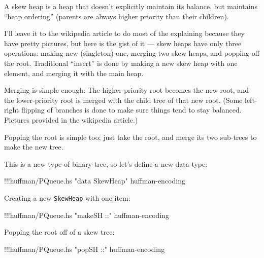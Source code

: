 \documentclass[]{article}
\newenvironment{Shaded}{}{}
\newcommand{\StringTok}[1]{\textcolor[rgb]{0.25,0.44,0.63}{{#1}}}
\newcommand{\FunctionTok}[1]{\textcolor[rgb]{0.02,0.16,0.49}{{#1}}}
\newcommand{\NormalTok}[1]{{#1}}
\begin{document}
A skew heap is a heap that doesn't explicitly maintain its balance, but
maintains ``heap ordering'' (parents are always higher priority than
their children).

I'll leave it to the wikipedia article to do most of the explaining
because they have pretty pictures, but here is the gist of it --- skew
heaps have only three operations: making new (singleton) one, merging
two skew heaps, and popping off the root. Traditional ``insert'' is done
by making a new skew heap with one element, and merging it with the main
heap.

Merging is simple enough: The higher-priority root becomes the new root,
and the lower-priority root is merged with the child tree of that new
root. (Some left-right flipping of branches is done to make sure things
tend to stay balanced. Pictures provided in the wikipedia article.)

Popping the root is simple too; just take the root, and merge its two
sub-trees to make the new tree.

This is a new type of binary tree, so let's define a new data type:

\begin{Shaded}
\begin{Highlighting}[]
\FunctionTok{!!!}\NormalTok{huffman}\FunctionTok{/}\NormalTok{PQueue.hs }\StringTok{"data SkewHeap"} \NormalTok{huffman}\FunctionTok{-}\NormalTok{encoding}
\end{Highlighting}
\end{Shaded}

Creating a new \texttt{SkewHeap} with one item:

\begin{Shaded}
\begin{Highlighting}[]
\FunctionTok{!!!}\NormalTok{huffman}\FunctionTok{/}\NormalTok{PQueue.hs }\StringTok{"makeSH ::"} \NormalTok{huffman}\FunctionTok{-}\NormalTok{encoding}
\end{Highlighting}
\end{Shaded}

Popping the root off of a skew tree:

\begin{Shaded}
\begin{Highlighting}[]
\FunctionTok{!!!}\NormalTok{huffman}\FunctionTok{/}\NormalTok{PQueue.hs }\StringTok{"popSH ::"} \NormalTok{huffman}\FunctionTok{-}\NormalTok{encoding}
\end{Highlighting}
\end{Shaded}
\end{document}
